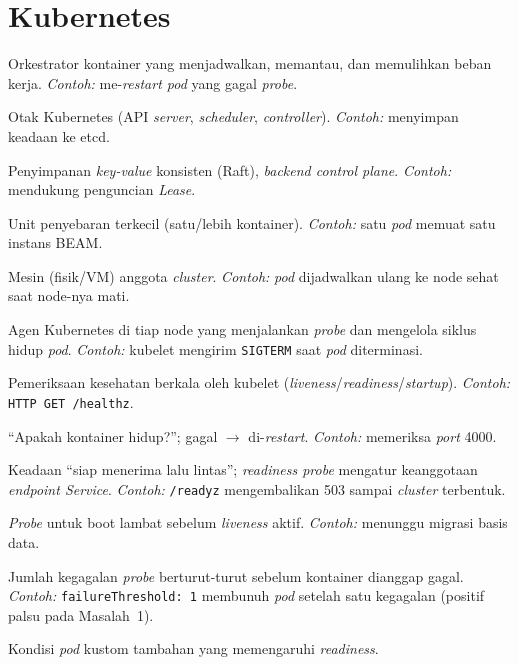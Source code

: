 \section{Kubernetes}
\begin{description}[style=nextline,leftmargin=1.4em]
  \item[Kubernetes] Orkestrator kontainer yang menjadwalkan, memantau, dan memulihkan
    beban kerja. \emph{Contoh:} me-\emph{restart pod} yang gagal \emph{probe}.
  \item[Control plane] Otak Kubernetes (API \emph{server}, \emph{scheduler}, \emph{controller}).
    \emph{Contoh:} menyimpan keadaan ke etcd.
  \item[etcd] Penyimpanan \emph{key-value} konsisten (Raft), \emph{backend control plane}.
    \emph{Contoh:} mendukung penguncian \emph{Lease}.
  \item[Pod] Unit penyebaran terkecil (satu/lebih kontainer). \emph{Contoh:} satu \emph{pod}
    memuat satu instans BEAM.
  \item[Node] Mesin (fisik/VM) anggota \emph{cluster}. \emph{Contoh:} \emph{pod}
    dijadwalkan ulang ke node sehat saat node-nya mati.
  \item[kubelet] Agen Kubernetes di tiap node yang menjalankan \emph{probe} dan mengelola
    siklus hidup \emph{pod}. \emph{Contoh:} kubelet mengirim \texttt{SIGTERM} saat \emph{pod} diterminasi.
  \item[Probe] Pemeriksaan kesehatan berkala oleh kubelet (\emph{liveness}/\emph{readiness}/\emph{startup}).
    \emph{Contoh:} \texttt{HTTP GET /healthz}.
  \item[Liveness probe] ``Apakah kontainer hidup?''; gagal $\rightarrow$ di-\emph{restart}.
    \emph{Contoh:} memeriksa \emph{port} 4000.
  \item[Readiness] Keadaan ``siap menerima lalu lintas''; \emph{readiness probe} mengatur
    keanggotaan \emph{endpoint Service}. \emph{Contoh:} \texttt{/readyz} mengembalikan 503
    sampai \emph{cluster} terbentuk.
  \item[Startup probe] \emph{Probe} untuk boot lambat sebelum \emph{liveness} aktif.
    \emph{Contoh:} menunggu migrasi basis data.
  \item[failureThreshold] Jumlah kegagalan \emph{probe} berturut-turut sebelum kontainer
    dianggap gagal. \emph{Contoh:} \texttt{failureThreshold: 1} membunuh \emph{pod} setelah
    satu kegagalan (positif palsu pada Masalah~1).
  \item[Readiness gate] Kondisi \emph{pod} kustom tambahan yang memengaruhi \emph{readiness}.

\end{description}
